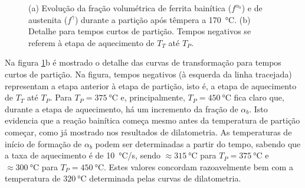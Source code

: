 \begin{figure}
  \vspace{0pt}
  \caption{(a) Evolução da fração volumétrica de ferrita bainítica ($f^{\alpha_b}$) e de austenita ($f^\gamma$) durante a partição após têmpera a \SI{170}{\degreeCelsius}. (b) Detalhe para tempos curtos de partição. Tempos negativos se referem à etapa de aquecimento de $T_T$ até $T_P$.}
  \label{fig:XTMS_ffase}
\end{figure}

Na figura \ref{fig:XTMS_ffase}b é mostrado o detalhe das curvas de transformação para tempos curtos de partição. Na figura, tempos negativos (à esquerda da linha tracejada) representam a etapa anterior à etapa de partição, isto é, a etapa de aquecimento de $T_T$ até $T_P$. Para $T_P = \SI{375}{\degreeCelsius}$ e, principalmente, $T_P = \SI{450}{\degreeCelsius}$ fica claro que, durante a etapa de aquecimento, há um incremento da fração de $\alpha_b$. Isto evidencia que a reação bainítica começa mesmo antes da temperatura de partição começar, como já mostrado nos resultados de dilatometria. As temperaturas de início de formação de $\alpha_b$ podem ser determinadas a partir do tempo, sabendo que a taxa de aquecimento é de \SI{10}{\degreeCelsius/s}, sendo $\approx \SI{315}{\degreeCelsius}$ para $T_P = \SI{375}{\degreeCelsius}$ e $\approx \SI{300}{\degreeCelsius}$ para $T_P = \SI{450}{\degreeCelsius}$. Estes valores concordam razoavelmente bem com a temperatura de $\SI{320}{\degreeCelsius}$ determinada pelas curvas de dilatometria.

